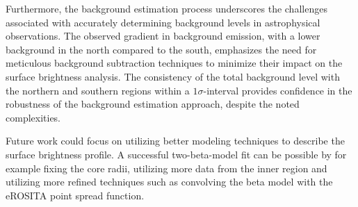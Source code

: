 Furthermore, the background estimation process underscores the challenges associated with accurately determining background levels in astrophysical observations. The observed gradient in background emission, with a lower background in the north compared to the south, emphasizes the need for meticulous background subtraction techniques to minimize their impact on the surface brightness analysis. The consistency of the total background level with the northern and southern regions within a \(1\sigma\)-interval provides confidence in the robustness of the background estimation approach, despite the noted complexities.

Future work could focus on utilizing better modeling techniques to describe the surface brightness profile. A successful two-beta-model fit can be possible by for example fixing the core radii, utilizing more data from the inner region and utilizing more refined techniques such as convolving the beta model with the eROSITA point spread function. 

